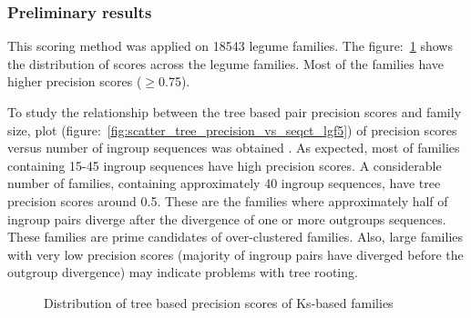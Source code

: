\documentclass{article}
\begin{document}
		\subsubsection{Preliminary results}
		This scoring method was applied on 18543 legume families. The figure:~\ref{fig:hist_tree_precision_scores_lgf5} shows the distribution of scores across the legume families. Most of the families have higher precision scores ($\geq$0.75).
		
		To study the relationship between the tree based pair precision scores and family size, plot (figure:~\ref{fig:scatter_tree_precision_vs_seqct_lgf5}) of precision scores versus number of ingroup sequences was obtained . As expected, most of families containing 15-45 ingroup sequences  have high precision scores. A considerable number of families, containing approximately 40 ingroup sequences, have tree precision scores around 0.5. These are the families where approximately half of ingroup pairs diverge after the divergence of one or more outgroups sequences. These families are prime candidates of over-clustered families. Also, large families with very low precision scores (majority of ingroup pairs have diverged before the outgroup divergence) may indicate problems with tree rooting.
		
		
		\begin{figure}[h!]
			\caption{Distribution of tree based precision scores of Ks-based families}
			\label{fig:hist_tree_precision_scores_lgf5}
		\end{figure}
		
\end{document}
